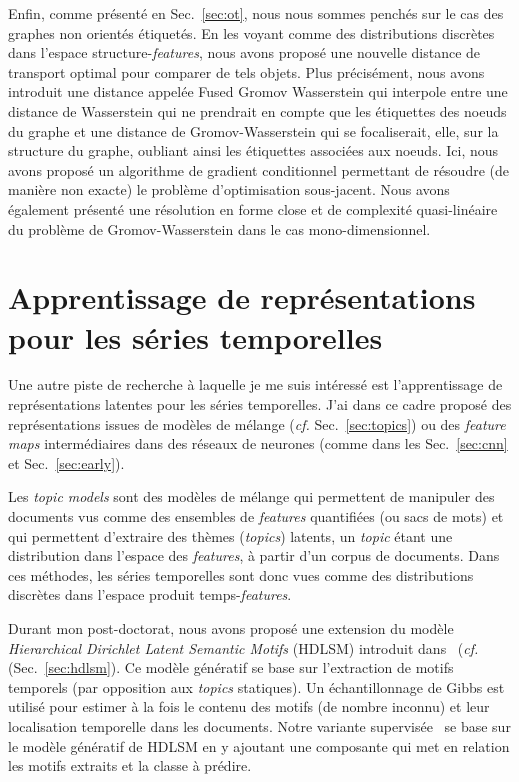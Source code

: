 \haveabreak{}

Enfin, comme présenté en Sec.~\ref{sec:ot}, nous nous sommes penchés sur le cas
des graphes non orientés étiquetés.
En les voyant comme des distributions discrètes dans l'espace
structure-\emph{features}, nous avons proposé une nouvelle distance de transport
optimal pour comparer de tels objets.
Plus précisément, nous avons introduit une distance appelée
Fused Gromov Wasserstein qui interpole entre une distance de Wasserstein qui ne
prendrait en compte que les étiquettes des noeuds du graphe et une distance de
Gromov-Wasserstein qui se focaliserait, elle, sur la structure du graphe,
oubliant ainsi les étiquettes associées aux noeuds.
Ici, nous avons proposé un algorithme de gradient conditionnel permettant
de résoudre (de manière non exacte) le problème d'optimisation sous-jacent.
Nous avons également présenté une résolution en forme close et de complexité
quasi-linéaire du problème de Gromov-Wasserstein dans le cas mono-dimensionnel.

\section*{Apprentissage de représentations pour les séries temporelles}

Une autre piste de recherche à laquelle je me suis intéressé est
l'apprentissage de représentations latentes pour les séries temporelles.
J'ai dans ce cadre proposé des représentations issues de
modèles de mélange (\emph{cf.} Sec.~\ref{sec:topics}) ou des \emph{feature maps}
intermédiaires dans des réseaux de neurones (comme dans les
Sec.~\ref{sec:cnn} et Sec.~\ref{sec:early}).

\haveabreak{}

Les \emph{topic models} sont des modèles de mélange qui permettent de manipuler
des documents vus comme des ensembles de \emph{features} quantifiées (ou sacs de
mots) et qui permettent d'extraire des thèmes (\emph{topics}) latents, un
\emph{topic} étant une distribution dans l'espace des \emph{features}, à partir
d'un corpus de documents.
Dans ces méthodes, les séries temporelles sont donc vues comme des
distributions discrètes dans l'espace produit temps-\emph{features}.

Durant mon post-doctorat, nous avons proposé une extension du modèle
\emph{Hierarchical Dirichlet Latent Semantic Motifs}
(HDLSM) introduit dans~\cite{EmonetCVPR2011} (\emph{cf.} (Sec.~\ref{sec:hdlsm}).
Ce modèle génératif se base sur l'extraction de motifs temporels
(par opposition aux \emph{topics} statiques).
Un échantillonnage de Gibbs est utilisé pour estimer à la fois le contenu des
motifs (de nombre inconnu) et leur localisation temporelle dans les documents.
Notre variante supervisée~\cite{tavenard:hal-00872048} se base sur le modèle
génératif de HDLSM en y ajoutant une composante qui met en relation les motifs
extraits et la classe à prédire.

